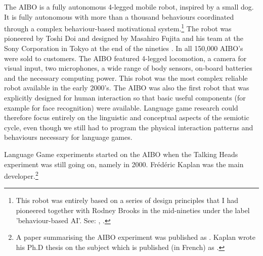 The AIBO is a fully autonomous 4-legged mobile robot, inspired by a small dog. It is fully autonomous with more than 
a thousand behaviours coordinated through a complex behaviour-based motivational 
system.\footnote{This robot was entirely based on a series of design principles that I had pioneered together with Rodney 
Brooks in the mid-nineties under the label 'behaviour-based AI'. See: \cite{Steels:1995}, \cite{Steels:1994}.}
The robot was pioneered by
Toshi Doi and designed by Masahiro Fujita and his team at the Sony Corporation in Tokyo at the end of 
the nineties \citep{Fujita:1998}. 
In all 150,000 AIBO's were sold to customers. The AIBO featured 4-legged locomotion, 
a camera for visual input, two microphones, a wide range of body sensors, on-board batteries and the necessary 
computing power. This robot was the most complex reliable robot available in the early 2000's. 
The AIBO was also the first robot that was explicitly designed for 
human interaction so that basic useful components (for example for face recognition) were available. Language game research
could therefore focus entirely on the linguistic and conceptual aspects of the semiotic cycle, even though 
we still had to program the physical interaction patterns and behaviours necessary for language games. 

Language Game experiments started on the AIBO when the Talking Heads experiment 
was still going on, namely in 2000. Fr\'{e}d\'{e}ric Kaplan was the main developer.\footnote{A paper summarising 
the AIBO experiment was published as \cite{Steels:2001}. Kaplan wrote his Ph.D thesis on the subject 
which is published (in French) as \cite{Kaplan:2001}.}

